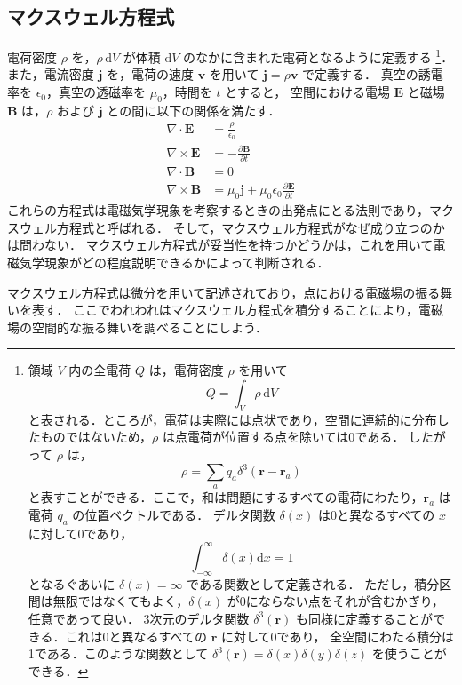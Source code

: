 \documentclass[11pt, a4paper]{ltjsarticle}
\numberwithin{equation}{section}
\begin{document}
\subsection{マクスウェル方程式}
電荷密度 $\rho$ を，$\rho \, \mathrm{d}V$ が体積 $\mathrm{d}V$ のなかに含まれた電荷となるように定義する
\footnote{領域 $V$ 内の全電荷 $Q$ は，電荷密度 $\rho$ を用いて
\[
  Q = \int_V \rho \, \mathrm{d}V
\]
と表される．ところが，電荷は実際には点状であり，空間に連続的に分布したものではないため，$\rho$ は点電荷が位置する点を除いては0である．
したがって $\rho$ は，
\[
  \rho = \sum_a q_a \delta^{3} \left( \bm{r} - \bm{r}_a \right)
\]
と表すことができる．ここで，和は問題にするすべての電荷にわたり，$\bm{r}_a$ は電荷 $q_a$ の位置ベクトルである．
デルタ関数 $\delta \left( x \right)$ は0と異なるすべての $x$ に対して0であり，
\[
  \int_{- \infty}^{\infty} \delta \left( x \right) \mathrm{d}x = 1
\]
となるぐあいに $\delta \left( x \right) = \infty$ である関数として定義される．
ただし，積分区間は無限ではなくてもよく，$\delta \left( x \right)$ が0にならない点をそれが含むかぎり，任意であって良い．
3次元のデルタ関数 $\delta^{3} \left( \bm{r} \right)$ も同様に定義することができる．これは0と異なるすべての $\bm{r}$ に対して0であり，
全空間にわたる積分は1である．このような関数として $\delta^{3} \left( \bm{r} \right) = \delta \left( x \right) \delta \left( y \right) \delta \left( z \right)$ を使うことができる．
}．
また，電流密度 $\bm{j}$ を，電荷の速度 $\bm{v}$ を用いて $\bm{j} = \rho \bm{v}$ で定義する．
真空の誘電率を $\epsilon_0$，真空の透磁率を $\mu_0$，時間を $t$ とすると，
空間における電場 $\bm{E}$ と磁場 $\bm{B}$ は，$\rho$ および $\bm{j}$ との間に以下の関係を満たす．
\begin{align}
  \nabla \cdot \bm{E} &= \frac{\rho}{\epsilon_0} \\
  \nabla \times \bm{E} &= - \frac{\partial \bm{B}}{\partial t} \\
  \nabla \cdot \bm{B} &= 0 \\
  \nabla \times \bm{B} &= \mu_0 \bm{j} + \mu_0 \epsilon_0 \frac{\partial \bm{E}}{\partial t} 
\end{align}
これらの方程式は電磁気学現象を考察するときの出発点にとる法則であり，マクスウェル方程式と呼ばれる．
そして，マクスウェル方程式がなぜ成り立つのかは問わない．
マクスウェル方程式が妥当性を持つかどうかは，これを用いて電磁気学現象がどの程度説明できるかによって判断される．

マクスウェル方程式は微分を用いて記述されており，点における電磁場の振る舞いを表す．
ここでわれわれはマクスウェル方程式を積分することにより，電磁場の空間的な振る舞いを調べることにしよう．
\end{document}
